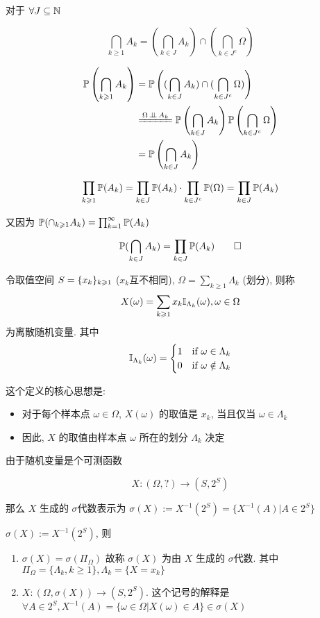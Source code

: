 对于 $\forall J\subseteq \mathbb{N}$

\[
\bigcap_{k\geq 1}A_k=\left(\bigcap_{k\in J}A_k\right)\cap \left(\bigcap_{k\in J^c}\Omega\right)
\]

\[
\begin{aligned}
    \PP\left(\bigcap_{k\geq 1}A_k\right) &=\PP\left((\bigcap_{k\in J}A_k)\cap (\bigcap_{k\in J^c}\Omega)\right)\\
    &\xlongequal{\Omega\ind A_k}\PP\left(\bigcap_{k\in J}A_k\right)\PP\left(\bigcap_{k\in J^c}\Omega\right)\\
    &=\PP\left(\bigcap_{k\in J}A_k\right)
\end{aligned}
\]

\[
\prod_{k\geqslant 1}\mathbb{P}(A_k)=\prod_{k\in J}\mathbb{P}(A_k)\cdot \prod_{k\in J^c}\mathbb{P}(\Omega)=\prod_{k\in J}\mathbb{P}(A_k)
\]

又因为 $\mathbb{P}(\cap_{k\geqslant 1}A_k)=\prod_{k=1}^{\infty}\mathbb{P}(A_k)$

\[
\mathbb{P}(\bigcap_{k\in J}A_k)=\prod_{k\in J}\mathbb{P}(A_k)\qed
\]

\begin{definition}[离散随机变量]\label{def:discrete_rv}
    令取值空间 $S=\{{x}_{k}\}_{k \geqslant 1}$ ($x_k$互不相同), $\Omega=\sum_{k\geq 1}\Lambda_k$ (划分), 则称 
\begin{equation}
X(\omega)=\sum_{k\geqslant 1}x_k\mathbb I_{\Lambda_k}(\omega), \omega\in \Omega
\label{eq:def_drv}
\end{equation}
为离散随机变量. 其中
\[
\mathbb I_{\Lambda_k}(\omega)=\begin{cases}
        1 & \text{if }\omega\in \Lambda_k\\
        0 & \text{if }\omega\notin \Lambda_k
\end{cases}
\]
\end{definition}

这个定义的核心思想是: 

\begin{itemize}
    \item 对于每个样本点 $\omega\in \Omega$, $X(\omega)$ 的取值是 $x_k$, 当且仅当 $\omega\in \Lambda_k$
    \item 因此, $X$ 的取值由样本点 $\omega$ 所在的划分 $\Lambda_k$ 决定
\end{itemize}

由于随机变量是个可测函数 

\[
X:(\Omega, ?)\rightarrow (S,2^S)
\]

那么 $X$ 生成的 $\sigma$代数表示为 $\sigma(X):=X^{-1}(2^S)=\{X^{-1}(A)|A\in 2^S\}$

\begin{property}\label{prt:p10-prt1.6}
$\sigma(X):=X^{-1}(2^S)$, 则

\begin{enumerate}
    \item $\sigma(X)=\sigma(\Pi_{\Omega})$ 故称 $\sigma(X)$ 为由 $X$ 生成的 $\sigma$代数. 其中 $\Pi_{\Omega}=\{\Lambda_k,k\geq 1\}, \Lambda_k=\{X=x_k\}$
    \item $X:(\Omega,\sigma(X))\rightarrow (S,2^S)$. 这个记号的解释是 $\forall A\in 2^S, X^{-1}(A)=\{\omega\in \Omega|X(\omega)\in A\}\in \sigma(X)$
\end{enumerate}
\end{property}

